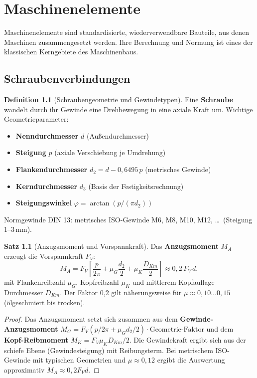 ﻿\documentclass[a4paper,12pt]{report}
\theoremstyle{definition}
\newtheorem{definition}{Definition}
\newtheorem{satz}{Satz}
\begin{document}
\chapter{Maschinenelemente}

Maschinenelemente sind standardisierte, wiederverwendbare Bauteile,
aus denen Maschinen zusammengesetzt werden. Ihre Berechnung und
Normung ist eines der klassischen Kerngebiete des Maschinenbaus.

\section{Schraubenverbindungen}

\begin{definition}[Schraubengeometrie und Gewindetypen]
Eine \textbf{Schraube} wandelt durch ihr Gewinde eine Drehbewegung
in eine axiale Kraft um. Wichtige Geometrieparameter:
\begin{itemize}
    \item[-] \textbf{Nenndurchmesser} $d$ (Au\ss{}endurchmesser)
    \item[-] \textbf{Steigung} $p$ (axiale Verschiebung je Umdrehung)
    \item[-] \textbf{Flankendurchmesser} $d_2 = d - 0{,}6495\,p$ (metrisches Gewinde)
    \item[-] \textbf{Kerndurchmesser} $d_3$ (Basis der Festigkeitsrechnung)
    \item[-] \textbf{Steigungswinkel} $\varphi = \arctan(p/(\pi d_2))$
\end{itemize}
Normgewinde DIN 13: metrisches ISO-Gewinde M6, M8, M10, M12, \ldots\ (Steigung 1--3\,mm).
\end{definition}

\begin{satz}[Anzugsmoment und Vorspannkraft]
Das \textbf{Anzugsmoment} $M_A$ erzeugt die Vorspannkraft $F_V$:
\[
  M_A = F_V\left[\frac{p}{2\pi} + \mu_G\frac{d_2}{2} + \mu_K\frac{D_{Km}}{2}\right]
      \approx 0{,}2\,F_V\,d,
\]
mit Flankenreibzahl $\mu_G$, Kopfreibzahl $\mu_K$ und mittlerem
Kopfauflage-Durchmesser $D_{Km}$. Der Faktor 0{,}2 gilt n\"aherungsweise
f\"ur $\mu \approx 0{,}10\ldots0{,}15$ (\"olgeschmiert bis trocken).
\end{satz}
\begin{proof}
Das Anzugsmoment setzt sich zusammen aus dem \textbf{Gewinde-Anzugsmoment}
$M_G = F_V(p/2\pi + \mu_G d_2/2)\cdot\text{Geometrie-Faktor}$
und dem \textbf{Kopf-Reibmoment} $M_K = F_V\mu_K D_{Km}/2$.
Die Gewindekraft ergibt sich aus der schiefe Ebene (Gewindesteigung)
mit Reibungsterm. Bei metrischem ISO-Gewinde mit typischen Geometrien
und $\mu \approx 0{,}12$ ergibt die Auswertung approximativ $M_A \approx 0{,}2 F_V d$.
\end{proof}
\end{document}
